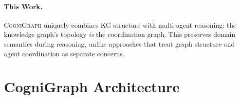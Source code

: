\documentclass[a4paper,11pt]{article}
\theoremstyle{definition}
\newcommand{\cogni}{\textsc{CogniGraph}}
\begin{document}
\paragraph{This Work.}
\cogni{} uniquely combines KG structure with multi-agent reasoning: the knowledge graph's topology \textit{is} the coordination graph.
This preserves domain semantics during reasoning, unlike approaches that treat graph structure and agent coordination as separate concerns.

\section{CogniGraph Architecture}
\label{sec:architecture}
\end{document}
